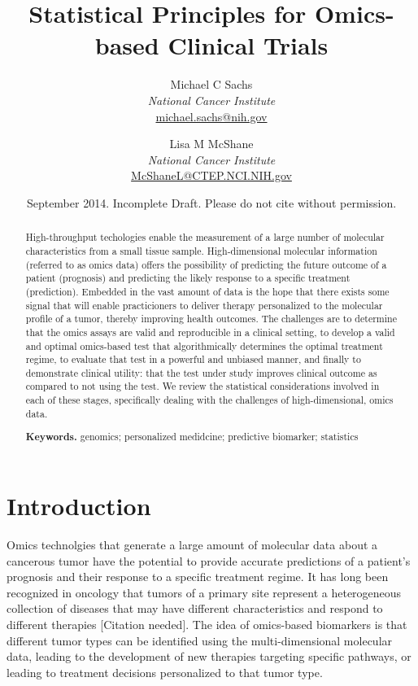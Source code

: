 \documentclass[11pt]{article}
\title{\bigskip \bigskip Statistical Principles for Omics-based Clinical Trials}
\author{\Large Michael C Sachs\vspace{0.05in} \\ \normalsize\emph{National Cancer Institute} \\ \footnotesize \url{michael.sachs@nih.gov}\vspace*{0.2in}\\  \and \Large Lisa M McShane\vspace{0.05in} \\ \normalsize\emph{National Cancer Institute} \\ \footnotesize \url{McShaneL@CTEP.NCI.NIH.gov}\vspace*{0.2in}\\ }
\date{\footnotesize September 2014. Incomplete Draft. Please do not cite without permission.}
\begin{document}
  
		




\maketitle


\begin{abstract}

\noindent High-throughput techologies enable the measurement of a large number of
molecular characteristics from a small tissue sample. High-dimensional
molecular information (referred to as omics data) offers the possibility
of predicting the future outcome of a patient (prognosis) and predicting
the likely response to a specific treatment (prediction). Embedded in
the vast amount of data is the hope that there exists some signal that
will enable practicioners to deliver therapy personalized to the
molecular profile of a tumor, thereby improving health outcomes. The
challenges are to determine that the omics assays are valid and
reproducible in a clinical setting, to develop a valid and optimal
omics-based test that algorithmically determines the optimal treatment
regime, to evaluate that test in a powerful and unbiased manner, and
finally to demonstrate clinical utility: that the test under study
improves clinical outcome as compared to not using the test. We review
the statistical considerations involved in each of these stages,
specifically dealing with the challenges of high-dimensional, omics
data.

\smallskip
\noindent \textbf{Keywords.} genomics; personalized medidcine; predictive biomarker; statistics

\end{abstract}


\section{Introduction}\label{introduction}

Omics technolgies that generate a large amount of molecular data about a
cancerous tumor have the potential to provide accurate predictions of a
patient's prognosis and their response to a specific treatment regime.
It has long been recognized in oncology that tumors of a primary site
represent a heterogeneous collection of diseases that may have different
characteristics and respond to different therapies {[}Citation
needed{]}. The idea of omics-based biomarkers is that different tumor
types can be identified using the multi-dimensional molecular data,
leading to the development of new therapies targeting specific pathways,
or leading to treatment decisions personalized to that tumor type.
\end{document}
